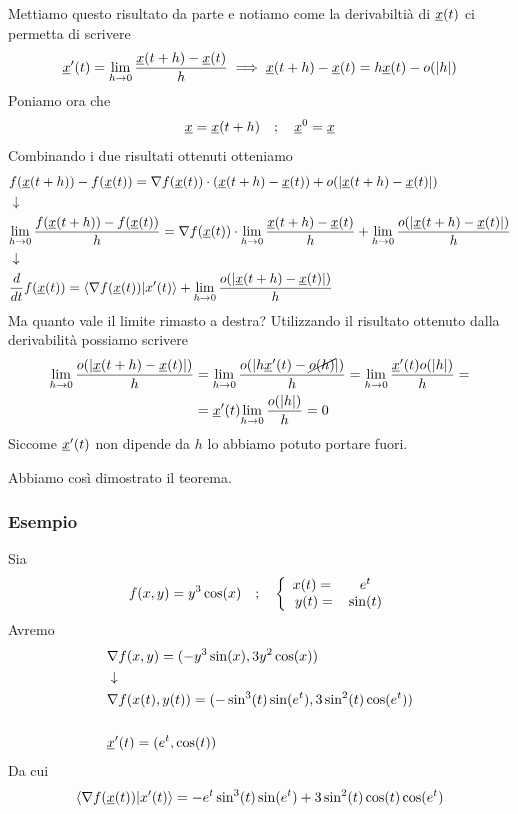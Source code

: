 Mettiamo questo risultato da parte e notiamo come la derivabiltià di $\underline{x}(t)$ ci permetta di scrivere
\begin{align}
	\underline{x}'(t)=\underset{h \rightarrow 0}{\lim} \, \frac{\underline{x}(t+h) - \underline{x}(t)}{h} \implies \underline{x}(t+h) - \underline{x}(t)= h\underline{x}(t) - o(|h|) 
\end{align}
Poniamo ora che
\begin{align}
	\underline{x} = \underline{x}(t+h) \quad ; \quad \underline{x}^0= \underline{x}
\end{align}
Combinando i due risultati ottenuti otteniamo
\begin{align}
	{}&f(\underline{x}(t+h))- f(\underline{x}(t)) = \nabla f(\underline{x}(t)) \cdot (\underline{x}(t+h) - \underline{x}(t)) + o(|\underline{x}(t+h) - \underline{x}(t)|) \nonumber \\ &\downarrow \nonumber \\
	&\underset{h \rightarrow 0}{\lim} \, \frac{f(\underline{x}(t+h))- f(\underline{x}(t))}{h} = \nabla f(\underline{x}(t)) \cdot \underset{h \rightarrow 0}{\lim} \, \frac{\underline{x}(t+h) - \underline{x}(t)}{h} + \underset{h \rightarrow 0}{\lim} \, \frac{o(|\underline{x}(t+h) - \underline{x}(t)|)}{h} \nonumber \\ &\downarrow \nonumber \\
	&\frac{d }{d t} f(\underline{x}(t)) = \braket{\nabla f(\underline{x}(t))|x'(t)} + \underset{h \rightarrow 0}{\lim} \, \frac{o(|\underline{x}(t+h) - \underline{x}(t)|)}{h}
\end{align}
Ma quanto vale il limite rimasto a destra? Utilizzando il risultato ottenuto dalla derivabilità possiamo scrivere
\begin{align}
	\underset{h \rightarrow 0}{\lim} \, \frac{o(|\underline{x}(t+h) - \underline{x}(t)|)}{h} {}&= \underset{h \rightarrow 0}{\lim} \, \frac{o(|h\underline{x}'(t) - \cancel{o(h)}|)}{h} = \underset{h \rightarrow 0}{\lim} \, \frac{\underline{x}'(t)o(|h|)}{h} = \nonumber \\
	&= \underline{x}'(t) \underset{h \rightarrow 0}{\lim} \, \frac{o(|h|)}{h} = 0 
\end{align}
Siccome $\underline{x}'(t)$ non dipende da $h$ lo abbiamo potuto portare fuori.

Abbiamo così dimostrato il teorema.

\subsubsection{Esempio}

Sia 
\begin{align}
	f(x,y)=y^3 \cos(x) \quad ; \quad \left\{\begin{array}{cc} x(t)={}&e^{t} \\ y(t)= &\sin(t) \end{array}\right.
\end{align}
Avremo
\begin{align}
	{}&\nabla f(x,y)=(-y^3 \sin (x), 3y^2 \cos(x))\nonumber \\ &\downarrow \nonumber \\ 
	&\nabla f(x(t),y(t)) = (-\sin^3(t) \sin (e^t), 3\sin^2(t) \cos(e^t)) \\
	\nonumber \\
	&\underline{x}'(t)=(e^t, \cos(t))
\end{align}
Da cui
\begin{align}
	\braket{\nabla f(\underline{x}(t))|x'(t)}=-e^t \sin^3(t)\sin(e^t) + 3\sin^2(t)\cos(t)\cos(e^t)
\end{align}

